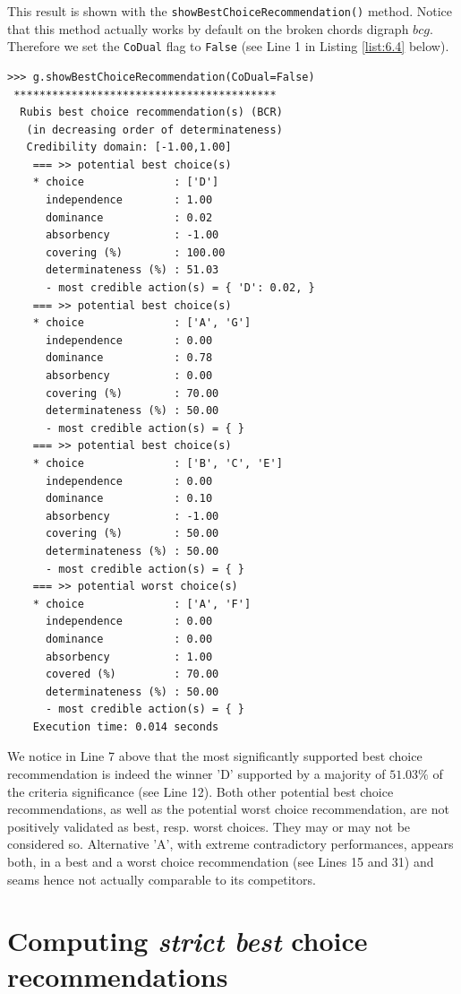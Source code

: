 This result is shown with the \texttt{showBestChoiceRecommendation()} method. Notice that this method actually works by default on the broken chords digraph $bcg$. Therefore we set the \texttt{CoDual} flag to \texttt{False} (see Line 1 in Listing \ref{list:6.4} below).
\begin{lstlisting}[caption={Computing a best choice recommendation},label=list:6.4]
>>> g.showBestChoiceRecommendation(CoDual=False)
 *****************************************
  Rubis best choice recommendation(s) (BCR)
   (in decreasing order of determinateness)   
   Credibility domain: [-1.00,1.00]
    === >> potential best choice(s)
    * choice              : ['D']
      independence        : 1.00
      dominance           : 0.02
      absorbency          : -1.00
      covering (%)        : 100.00
      determinateness (%) : 51.03
      - most credible action(s) = { 'D': 0.02, }
    === >> potential best choice(s)
    * choice              : ['A', 'G']
      independence        : 0.00
      dominance           : 0.78
      absorbency          : 0.00
      covering (%)        : 70.00
      determinateness (%) : 50.00
      - most credible action(s) = { }
    === >> potential best choice(s)
    * choice              : ['B', 'C', 'E']
      independence        : 0.00
      dominance           : 0.10
      absorbency          : -1.00
      covering (%)        : 50.00
      determinateness (%) : 50.00
      - most credible action(s) = { }
    === >> potential worst choice(s) 
    * choice              : ['A', 'F']
      independence        : 0.00
      dominance           : 0.00
      absorbency          : 1.00
      covered (%)         : 70.00
      determinateness (%) : 50.00
      - most credible action(s) = { }
    Execution time: 0.014 seconds
\end{lstlisting}
We notice in Line 7 above that the most significantly supported best choice recommendation is indeed the \Condorcet winner 'D' supported by a majority of $51.03\%$ of the criteria significance (see Line 12). Both other potential best choice recommendations, as well as the potential worst choice recommendation, are not positively validated as best, resp. worst choices. They may or may not be considered so. Alternative 'A', with extreme contradictory performances, appears both, in a best and a worst choice recommendation (see Lines 15 and 31) and seams hence not actually comparable to its competitors.

\section{Computing \emph{strict best} choice recommendations}
\label{sec:6.4}


